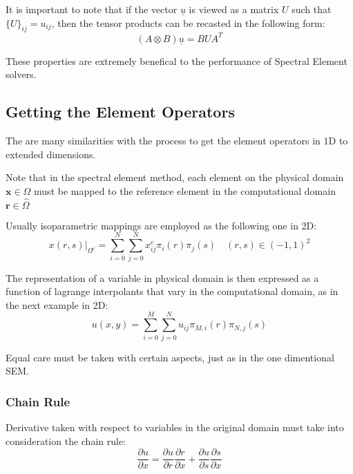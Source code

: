 \documentclass[
]{scrartcl}
\begin{document}
It is important to note that if the vector \(\underline{u}\) is viewed
as a matrix \(U\) such that \(\{U\}_{ij}=u_{ij}\), then the tensor
products can be recasted in the following form: \begin{equation}
        (A \otimes B)\underline{u} = BUA^{T}
    \end{equation}

These properties are extremely benefical to the performance of Spectral
Element solvers.

\hypertarget{getting-the-element-operators}{%
\subsection{Getting the Element
Operators}\label{getting-the-element-operators}}

The are many similarities with the process to get the element operators
in 1D to extended dimensions.

Note that in the spectral element method, each element on the physical
domain \(\textbf{x} \in \Omega\) must be mapped to the reference element
in the computational domain \(\textbf{r} \in \hat{\Omega}\)

Usually isoparametric mappings are employed as the following one in 2D:
\begin{equation}
\left.x(r,s)\right\rvert_{\Omega^{e}}=\sum_{i=0}^{N}\sum_{j=0}^{N} x_{ij}^{e} \pi_{i}(r) \pi_{j}(s) \quad (r,s) \in (-1,1)^{2}
\end{equation}

The representation of a variable in physical domain is then expressed as
a function of lagrange interpolants that vary in the computational
domain, as in the next example in 2D: \begin{equation}
    u(x,y)=\sum_{i=0}^{M}\sum_{j=0}^{N} u_{ij} \pi_{M,i}(r) \pi_{N,j}(s) 
\end{equation}

Equal care must be taken with certain aspects, just as in the one
dimentional SEM.

\hypertarget{chain-rule-1}{%
\subsubsection{Chain Rule}\label{chain-rule-1}}

Derivative taken with respect to variables in the original domain must
take into consideration the chain rule: \begin{equation}
    \frac{\partial u}{\partial x}=\frac{\partial u}{\partial r}\frac{\partial r}{\partial x}+\frac{\partial u}{\partial s}\frac{\partial s}{\partial x} 
\end{equation}
\end{document}
